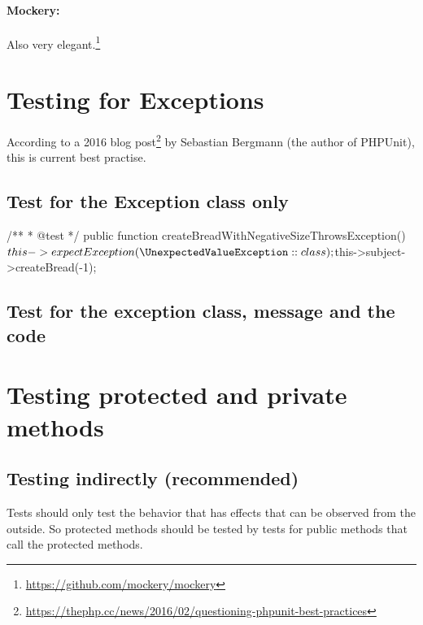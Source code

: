 \documentclass[a4paper,11pt,headsepline]{scrartcl}
\begin{document}
\paragraph{Mockery:} Also very elegant.\footnote{\url{https://github.com/mockery/mockery}}


\pagebreak
\section{Testing for Exceptions}

According to a 2016 blog post\footnote{\url{https://thephp.cc/news/2016/02/questioning-phpunit-best-practices}} by Sebastian Bergmann (the author of PHPUnit), this is current best practise.

\subsection{Test for the Exception class only}
\begin{phpcode}
/**
 * @test
 */
public function createBreadWithNegativeSizeThrowsException()
{
    $this->expectException(\UnexpectedValueException::class);

    $this->subject->createBread(-1);
}
\end{phpcode}

\subsection{Test for the exception class, message and the code}


\section{Testing protected and private methods}

\subsection{Testing indirectly (recommended)}

Tests should only test the behavior that has effects that can be observed from the outside. So protected methods should be tested by tests for public methods that call the protected methods.
\end{document}
